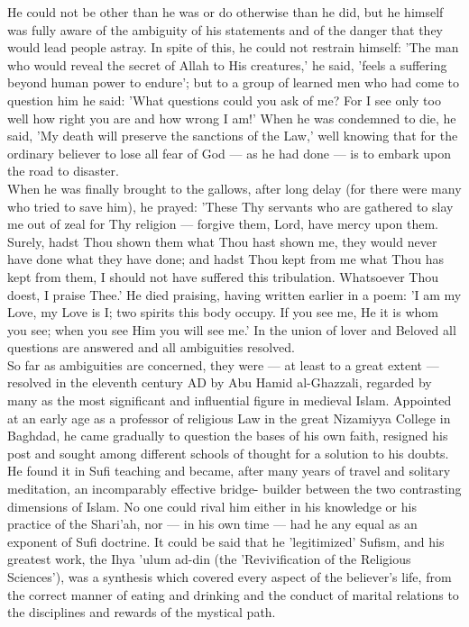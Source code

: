 \documentclass[10pt, twoside,openright]{book}
\begin{document}
He could not be other than he was or do otherwise than he did, but he himself was fully aware of the 
ambiguity of his statements and of the danger that they would lead people astray. In spite of this, 
he could not restrain himself: 'The man who would reveal the secret of Allah to His creatures,' he 
said, 'feels a suffering beyond human power to endure'; but to a group of learned men who had come to 
question him he said: 'What questions could you ask of me? For I see only too well how right you are 
and how wrong I am!' When he was condemned to die, he said, 'My death will preserve the sanctions of 
the Law,' well knowing that for the ordinary believer to lose all fear of God --- as he had done --- is 
to embark upon the road to disaster. \\

When he was finally brought to the gallows, after long delay (for there were many who tried to save 
him), he prayed: 'These Thy servants who are gathered to slay me out of zeal for Thy religion --- 
forgive them, Lord, have mercy upon them. Surely, hadst Thou shown them what Thou hast shown me, they 
would never have done what they have done; and hadst Thou kept from me what Thou has kept from them, 
I should not have suffered this tribulation. Whatsoever Thou doest, I praise Thee.' He died praising, 
having written earlier in a poem: 'I am my Love, my Love is I; two spirits this body occupy. If you 
see me, He it is whom you see; when you see Him you will see me.' In the union of lover and Beloved 
all questions are answered and all ambiguities resolved. \\

So far as ambiguities are concerned, they were --- at least to a great extent --- resolved in the eleventh 
century AD by Abu Hamid al\hyp{}Ghazzali, regarded by many as the most significant and influential figure 
in medieval Islam. Appointed at an early age as a professor of religious Law in the great Nizamiyya 
College in Baghdad, he came gradually to question the bases of his own faith, resigned his post and 
sought among different schools of thought for a solution to his doubts. He found it in Sufi teaching 
and became, after many years of travel and solitary meditation, an incomparably effective bridge\hyp{}
builder between the two contrasting dimensions of Islam. No one could rival him either in his 
knowledge or his practice of the Shari'ah, nor --- in his own time --- had he any equal as an exponent of 
Sufi doctrine. It could be said that he 'legitimized' Sufism, and his greatest work, the Ihya 'ulum 
ad\hyp{}din (the 'Revivification of the Religious Sciences'), was a synthesis which covered every aspect 
of the believer's life, from the correct manner of eating and drinking and the conduct of marital 
relations to the disciplines and rewards of the mystical path. \\
\end{document}
